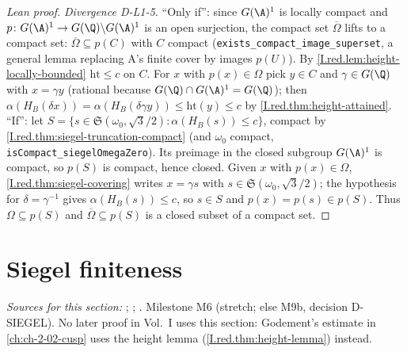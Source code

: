 \begin{proof}[Lean proof]
\emph{Divergence D-L1-5.} ``Only if'': since $G(\A)^1$ is locally compact and $p\colon G(\A)^1\to G(\Q)\backslash G(\A)^1$ is an open surjection, the compact set $\overline\Omega$ lifts to a compact set: $\overline\Omega\subseteq p(C)$ with $C$ compact (\texttt{exists\_compact\_image\_superset}, a general lemma replacing A's finite cover by images $p(U)$). By \cref{I.red.lem:height-locally-bounded} $\mathrm{ht}\le c$ on $C$. For $x$ with $p(x)\in\Omega$ pick $y\in C$ and $\gamma\in G(\Q)$ with $x=\gamma y$ (rational because $G(\Q)\cap G(\A)^1=G(\Q)$); then $\alpha(H_B(\delta x))=\alpha(H_B(\delta\gamma y))\le\mathrm{ht}(y)\le c$ by \cref{I.red.thm:height-attained}. ``If'': let $S=\{s\in\mathfrak S(\omega_0,\sqrt3/2):\alpha(H_B(s))\le c\}$, compact by \cref{I.red.thm:siegel-truncation-compact} (and $\omega_0$ compact, \texttt{isCompact\_siegelOmegaZero}). Its preimage in the closed subgroup $G(\A)^1$ is compact, so $p(S)$ is compact, hence closed. Given $x$ with $p(x)\in\Omega$, \cref{I.red.thm:siegel-covering} writes $x=\gamma s$ with $s\in\mathfrak S(\omega_0,\sqrt3/2)$; the hypothesis for $\delta=\gamma^{-1}$ gives $\alpha(H_B(s))\le c$, so $s\in S$ and $p(x)=p(s)\in p(S)$. Thus $\Omega\subseteq p(S)$ and $\overline\Omega\subseteq p(S)$ is a closed subset of a compact set.
\end{proof}

\section{Siegel finiteness}\label{sec:red-finiteness}

\noindent\emph{Sources for this section:} \cite[§1]{Bor-fin}; \cite[§6]{AIntro}; \cite[Lecture II]{Gel}. Milestone M6 (stretch;
else M9b, decision D-SIEGEL). No later proof in Vol.~I uses this section: Godement's estimate in \cref{ch:ch-2-02-cusp} uses
the height lemma (\cref{I.red.thm:height-lemma}) instead.

